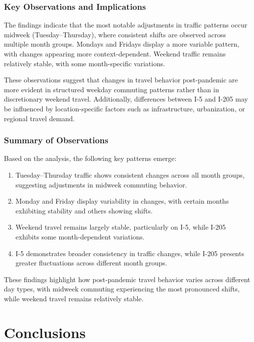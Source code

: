 \documentclass{article}
\begin{document}
\subsubsection{Key Observations and Implications}

The findings indicate that the most notable adjustments in traffic patterns occur midweek (Tuesday–Thursday), where consistent shifts are observed across multiple month groups. Mondays and Fridays display a more variable pattern, with changes appearing more context-dependent. Weekend traffic remains relatively stable, with some month-specific variations.

These observations suggest that changes in travel behavior post-pandemic are more evident in structured weekday commuting patterns rather than in discretionary weekend travel. Additionally, differences between I-5 and I-205 may be influenced by location-specific factors such as infrastructure, urbanization, or regional travel demand.

\subsubsection{Summary of Observations}

Based on the analysis, the following key patterns emerge:

\begin{enumerate}
    \item Tuesday–Thursday traffic shows consistent changes across all month groups, suggesting adjustments in midweek commuting behavior.
    \item Monday and Friday display variability in changes, with certain months exhibiting stability and others showing shifts.
    \item Weekend travel remains largely stable, particularly on I-5, while I-205 exhibits some month-dependent variations.
    \item I-5 demonstrates broader consistency in traffic changes, while I-205 presents greater fluctuations across different month groups.
\end{enumerate}

These findings highlight how post-pandemic travel behavior varies across different day types, with midweek commuting experiencing the most pronounced shifts, while weekend travel remains relatively stable.

\section{Conclusions}
\end{document}
